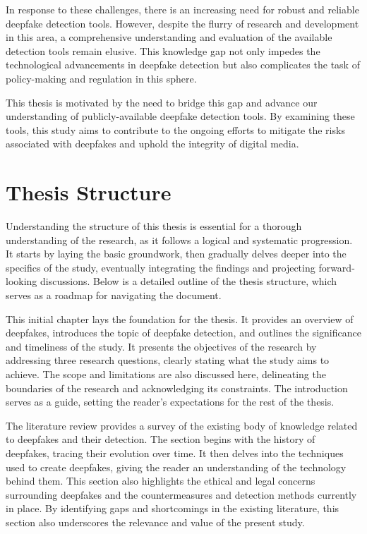 In response to these challenges, there is an increasing need for robust and reliable
deepfake detection tools. However, despite the flurry of research and development in this
area, a comprehensive understanding and evaluation of the available detection tools remain
elusive. This knowledge gap not only impedes the technological advancements in deepfake
detection but also complicates the task of policy-making and regulation in this sphere.

This thesis is motivated by the need to bridge this gap and advance our understanding of
publicly-available deepfake detection tools. By examining these tools, this study aims to
contribute to the ongoing efforts to mitigate the risks associated with deepfakes and uphold
the integrity of digital media.


\section{Thesis Structure}\label{chapter:structure}
Understanding the structure of this thesis is essential for a thorough understanding of the
research, as it follows a logical and systematic progression. It starts by laying the basic
groundwork, then gradually delves deeper into the specifics of the study, eventually
integrating the findings and projecting forward-looking discussions. Below is a
detailed outline of the thesis structure, which serves as a roadmap for navigating
the document.

This initial chapter lays the foundation for the thesis. It provides an overview of deepfakes,
introduces the topic of deepfake detection, and outlines the significance and timeliness
of the study. It presents the objectives of the research by addressing three research
questions, clearly stating what the study aims to achieve. The scope and limitations are
also discussed here, delineating the boundaries of the research and acknowledging
its constraints. The introduction serves as a guide, setting the reader's expectations
for the rest of the thesis.

The literature review provides a survey of the existing body of knowledge
related to deepfakes and their detection. The section begins with the history of
deepfakes, tracing their evolution over time. It then delves into the techniques used
to create deepfakes, giving the reader an understanding of the technology behind them.
This section also highlights the ethical and legal concerns surrounding deepfakes and
the countermeasures and detection methods currently in place. By identifying gaps and
shortcomings in the existing literature, this section also underscores the relevance
and value of the present study.

